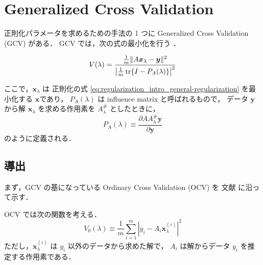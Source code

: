 %

\chapter{Generalized Cross Validation}

正則化パラメータを求めるための手法の 1 つに
Generalized Cross Validation (GCV) がある．
GCV では，次の式の最小化を行う
\cite{Wahba1990}．

\begin{equation}
    V(\lambda)
    = \frac{\frac{1}{m} \|A \bm{x}_\lambda - \bm{y}\|^2}
    {\left|\frac{1}{m} \operatorname{tr}\{I - P_A(\lambda)\}\right|^2}
    \label{eq:regularization_gcv_gcv-evaluation-function}
\end{equation}

ここで，$\bm{x}_\lambda$ は
正則化の式 \eqref{eq:regularization_intro_general-regularization} を最小化する
$\bm{x}$であり，
$P_A(\lambda)$ は  influence matrix と呼ばれるもので，
データ $\bm{y}$ から解 $\bm{x}_\lambda$ を求める作用素を $A_\lambda^\#$ としたときに，
\begin{equation}
    P_A(\lambda) \equiv
    \frac{\partial A A_\lambda^\# \bm{y}}{\partial \bm{y}}
    \label{eq:regularization_gcv_influence-matrix}
\end{equation}
のように定義される．

\section{導出}

まず，GCV の基になっている Ordinary Cross Validation (OCV) を
文献 \cite{Wahba1990} に沿って示す．

OCV では次の関数を考える．
\begin{equation}
    V_0(\lambda) \equiv
    \frac{1}{m} \sum_{i=1}^m
    \left|y_i - A_i \bm{x}_\lambda^{(i)}\right|^2
    \label{eq:regularization_gcv_ocv-evaluation-function}
\end{equation}
ただし，$\bm{x}_\lambda^{(i)}$ は $y_i$ 以外のデータから求めた解で，
$A_i$ は解からデータ $y_i$ を推定する作用素である．

